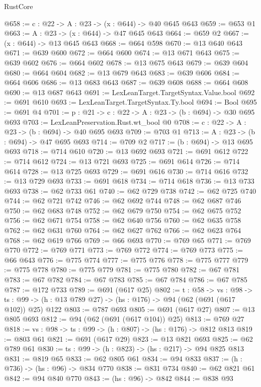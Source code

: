 \begin{lexlean}{RustCore}
\begin{coremodule}
@658 := {c : @22} -> {A : @23} -> (x : @644) -> @40 @645 @643
@659 := @653 @1
@663 := {A : @23} -> (x : @644) -> @47 @645 @643
@664 := @659 @2
@667 := (x : @644) -> @13 @645 @643
@668 := @664 @598
@670 := @13 @640 @643
@671 := @639 @600
@672 := @664 @600
@674 := @13 @671 @643
@675 := @639 @602
@676 := @664 @602
@678 := @13 @675 @643
@679 := @639 @604
@680 := @664 @604
@682 := @13 @679 @643
@683 := @639 @606
@684 := @664 @606
@686 := @13 @683 @643
@687 := @639 @608
@688 := @664 @608
@690 := @13 @687 @643
@691 := LexLeanTarget.TargetSyntax.Value.bool
@692 := @691 @610
@693 := LexLeanTarget.TargetSyntax.Ty.bool
@694 := Bool
@695 := @691 @4
@701 := {p : @21} -> {c : @22} -> {A : @23} -> (b : @694) -> @30 @695 @693
@703 := LexLeanPreservation.Rust.wt_bool @0
@708 := {c : @22} -> {A : @23} -> (b : @694) -> @40 @695 @693
@709 := @703 @1
@713 := {A : @23} -> (b : @694) -> @47 @695 @693
@714 := @709 @2
@717 := (b : @694) -> @13 @695 @693
@718 := @714 @610
@720 := @13 @692 @693
@721 := @691 @612
@722 := @714 @612
@724 := @13 @721 @693
@725 := @691 @614
@726 := @714 @614
@728 := @13 @725 @693
@729 := @691 @616
@730 := @714 @616
@732 := @13 @729 @693
@733 := @691 @618
@734 := @714 @618
@736 := @13 @733 @693
@738 := @62 @733 @61
@740 := @62 @729 @738
@742 := @62 @725 @740
@744 := @62 @721 @742
@746 := @62 @692 @744
@748 := @62 @687 @746
@750 := @62 @683 @748
@752 := @62 @679 @750
@754 := @62 @675 @752
@756 := @62 @671 @754
@758 := @62 @640 @756
@760 := @62 @635 @758
@762 := @62 @631 @760
@764 := @62 @627 @762
@766 := @62 @623 @764
@768 := @62 @619 @766
@769 := @66 @693
@770 := @769 @65
@771 := @769 @770
@772 := @769 @771
@773 := @769 @772
@774 := @769 @773
@775 := @66 @643
@776 := @775 @774
@777 := @775 @776
@778 := @775 @777
@779 := @775 @778
@780 := @775 @779
@781 := @775 @780
@782 := @67 @781
@783 := @67 @782
@784 := @67 @783
@785 := @67 @784
@786 := @67 @785
@787 := @172 @733
@789 := @691 (@617 @25)
@802 := {t : @58} ->
  {vs : @98} ->
  {ts : @99} -> (h : @13 @789 @27) -> (hs : @176) -> @94 (@62 (@691 (@617 @102)) @25) @122
@803 := @787 @693
@805 := @691 (@617 @27)
@807 := @13 @805 @693
@812 := @94 (@62 (@691 (@617 @104)) @25)
@813 := @769 @27
@818 := {vs : @98} -> {ts : @99} -> (h : @807) -> (hs : @176) -> @812 @813
@819 := @803 @61
@821 := @691 (@617 @29)
@823 := @13 @821 @693
@825 := @62 @789 @61
@830 := {ts : @99} -> (h : @823) -> (hs : @217) -> @94 @825 @813
@831 := @819 @65
@833 := @62 @805 @61
@834 := @94 @833
@837 := (h : @736) -> (hs : @96) -> @834 @770
@838 := @831 @734
@840 := @62 @821 @61
@842 := @94 @840 @770
@843 := (hs : @96) -> @842
@844 := @838 @93

\end{coremodule}
\end{lexlean}
